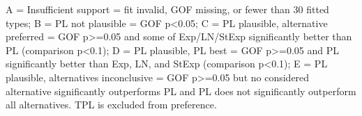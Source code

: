 \begin{flushleft}\footnotesize A = Insufficient support = fit invalid, GOF missing, or fewer than 30 fitted types; B = PL not plausible = GOF p<0.05; C = PL plausible, alternative preferred = GOF p>=0.05 and some of Exp/LN/StExp significantly better than PL (comparison p<0.1); D = PL plausible, PL best = GOF p>=0.05 and PL significantly better than Exp, LN, and StExp (comparison p<0.1); E = PL plausible, alternatives inconclusive = GOF p>=0.05 but no considered alternative significantly outperforms PL and PL does not significantly outperform all alternatives. TPL is excluded from preference.\end{flushleft}
